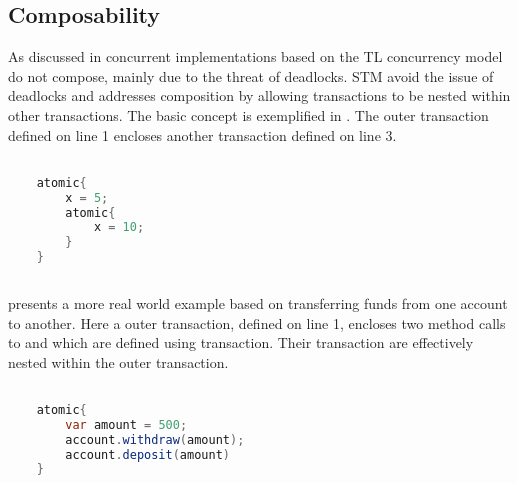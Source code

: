 \subsection{Composability}
\label{sec:stm_composability}
As discussed in  concurrent implementations based on the \ac{TL} concurrency model do not compose, mainly due to the threat of deadlocks. \ac{STM} avoid the issue of deadlocks and addresses composition by allowing transactions to be nested within other transactions. The basic concept is exemplified in . The outer transaction defined on line 1 encloses another transaction defined on line 3.

\begin{lstlisting}[label=lst:stm_nested_transactions,
  caption={Nested transactions},
  language=Java,  
  showspaces=false,
  showtabs=false,
  breaklines=true,
  showstringspaces=false,
  breakatwhitespace=true,
  commentstyle=\color{greencomments},
  keywordstyle=\color{bluekeywords},
  stringstyle=\color{redstrings},
  morekeywords={atomic, retry, orElse, var}]  % Start your code-block

	atomic{
		x = 5;
		atomic{
			x = 10;		
		}
	}
       
\end{lstlisting}

 presents a more real world example based on transferring funds from one account to another. Here a outer transaction, defined on line 1, encloses two method calls to  and  which are defined using transaction. Their transaction are effectively nested within the outer transaction.
\begin{lstlisting}[label=lst:stm_nested_transactions_real,
  caption={Real world nested transactions},
  language=Java,  
  showspaces=false,
  showtabs=false,
  breaklines=true,
  showstringspaces=false,
  breakatwhitespace=true,
  commentstyle=\color{greencomments},
  keywordstyle=\color{bluekeywords},
  stringstyle=\color{redstrings},
  morekeywords={atomic, retry, orElse, var}]  % Start your code-block

	atomic{
		var amount = 500;
		account.withdraw(amount);
		account.deposit(amount)
	}
       
\end{lstlisting}

